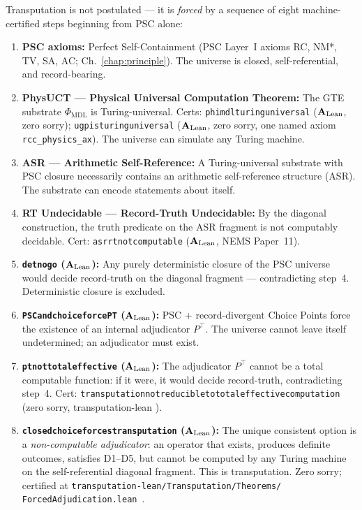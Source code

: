\documentclass[11pt,openany]{book}
\theoremstyle{remark}
\newcommand{\MDL}{\text{MDL}}
\newcommand{\lean}[1]{%
  \penalty-100
  \begingroup\def\_{\textunderscore\allowbreak}\texttt{#1}\endgroup}
\newcommand{\CatAL}{\ensuremath{\textbf{A}_{\rm Lean}}}
\begin{document}
Transputation is not postulated --- it is \emph{forced} by a sequence of eight
machine-certified steps beginning from PSC alone:

\begin{enumerate}

\item \textbf{PSC axioms:}
  Perfect Self-Containment (PSC Layer~I axioms RC, NM*, TV, SA, AC; Ch.~\ref{chap:principle}).
  The universe is closed, self-referential, and record-bearing.

\item \textbf{PhysUCT --- Physical Universal Computation Theorem:}
  The GTE substrate $\Phi_{\MDL}$ is Turing-universal.  Certs: \lean{phimdl\_turing\_universal}
  (\CatAL, zero sorry); \lean{ugp\_is\_turing\_universal} (\CatAL, zero sorry, one named
  axiom \texttt{rcc\_physics\_ax}).  The universe can simulate any Turing machine.

\item \textbf{ASR --- Arithmetic Self-Reference:}
  A Turing-universal substrate with PSC closure necessarily contains an arithmetic
  self-reference structure (ASR).  The substrate can encode statements about itself.

\item \textbf{RT Undecidable --- Record-Truth Undecidable:}
  By the diagonal construction, the truth predicate on the ASR fragment is not computably
  decidable.  Cert: \lean{asr\_rt\_not\_computable} (\CatAL, NEMS Paper~11).

\item \textbf{\lean{det\_no\_go} (\CatAL):}
  Any purely deterministic closure of the PSC universe would decide record-truth
  on the diagonal fragment --- contradicting step~4.  Deterministic closure is excluded.

\item \textbf{\lean{PSC\_and\_choice\_force\_PT} (\CatAL):}
  PSC + record-divergent Choice Points force the existence of an internal adjudicator
  $P^\top$.  The universe cannot leave itself undetermined; an adjudicator must exist.

\item \textbf{\lean{pt\_not\_total\_effective} (\CatAL):}
  The adjudicator $P^\top$ cannot be a total computable function: if it were, it would
  decide record-truth, contradicting step~4.
  Cert: \lean{transputation\_not\_reducible\_to\_total\_effective\_computation}
  (zero sorry, transputation-lean \cite{SpivackNEMS76}).

\item \textbf{\lean{closed\_choice\_forces\_transputation} (\CatAL):}
  The unique consistent option is a \emph{non-computable adjudicator}: an operator that
  exists, produces definite outcomes, satisfies D1--D5, but cannot be computed by any
  Turing machine on the self-referential diagonal fragment.  This is transputation.
  Zero sorry; certified at \texttt{transputation-lean/Transputation/Theorems/%
  ForcedAdjudication.lean}~\cite{SpivackNEMS76}.

\end{enumerate}
\end{document}
